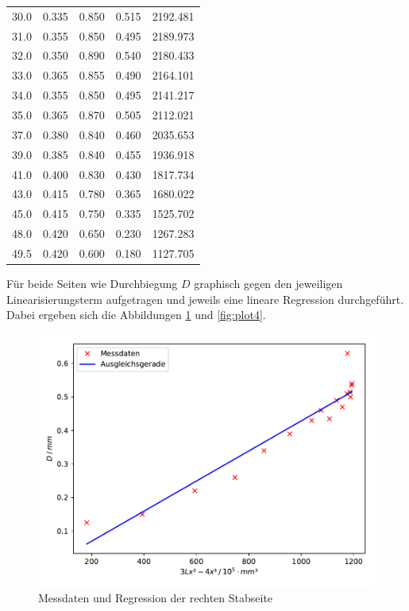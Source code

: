 \begin{table}
\begin{tabular}{c c c c c}
30.0 & 0.335 & 0.850 & 0.515 & 2192.481\\
31.0 & 0.355 & 0.850 & 0.495 & 2189.973\\
32.0 & 0.350 & 0.890 & 0.540 & 2180.433\\
33.0 & 0.365 & 0.855 & 0.490 & 2164.101\\
34.0 & 0.355 & 0.850 & 0.495 & 2141.217\\
35.0 & 0.365 & 0.870 & 0.505 & 2112.021\\
37.0 & 0.380 & 0.840 & 0.460 & 2035.653\\
39.0 & 0.385 & 0.840 & 0.455 & 1936.918\\
41.0 & 0.400 & 0.830 & 0.430 & 1817.734\\
43.0 & 0.415 & 0.780 & 0.365 & 1680.022\\
45.0 & 0.415 & 0.750 & 0.335 & 1525.702\\
48.0 & 0.420 & 0.650 & 0.230 & 1267.283\\
49.5 & 0.420 & 0.600 & 0.180 & 1127.705\\
\bottomrule
\end{tabular}
\end{table}

Für beide Seiten wie Durchbiegung $D$ graphisch gegen den jeweiligen
Linearisierungsterm aufgetragen und jeweils eine lineare Regression
durchgeführt. Dabei ergeben sich die Abbildungen \ref{fig:plot3} und 
\ref{fig:plot4}. 

\begin{figure}
  \centering
  \includegraphics[scale=0.8]{content/plot3.pdf}
  \caption{Messdaten und Regression der rechten Stabseite}
  \label{fig:plot3}
\end{figure}

